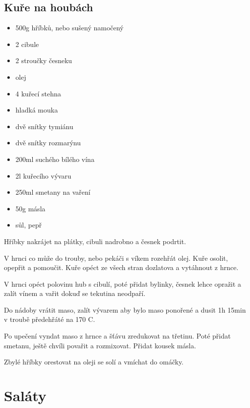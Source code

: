 \documentclass[10pt,a4paper]{article}
\newenvironment{myitemize}
{ \begin{itemize}
    \setlength{\itemsep}{0pt}
    \setlength{\parskip}{0pt}
    \setlength{\parsep}{0pt}     }
{ \end{itemize}                  }
\begin{document}
\subsection{Kuře na houbách}
\begin{minipage}[t]{0,5\textwidth}
\begin{myitemize} 
\item 500g hříbků, nebo sušený namočený
\item 2 cibule
\item 2 stroučky česneku
\item olej
\item 4 kuřecí stehna
\item hladká mouka
\item dvě snítky tymiánu
\item dvě snítky rozmarýnu
\item 200ml suchého bílého vína
\item 2l kuřecího vývaru
\item 250ml smetany na vaření
\item 50g másla
\item sůl, pepř
\end{myitemize}
\end{minipage}
\begin{minipage}[t]{0,5\textwidth}
Hříbky nakrájet na plátky, cibuli nadrobno a česnek podrtit.

V hrnci co může do trouby, nebo pekáči s víkem rozehřát olej. Kuře osolit, opepřit a pomoučit. Kuře opéct ze všech stran dozlatova a vytáhnout z hrnce.

V hrnci opéct polovinu hub s cibulí, poté přidat bylinky, česnek lehce opražit a zalít vínem a vařit dokuď se tekutina neodpaří.

Do nádoby vrátit maso, zalít vývarem aby bylo maso ponořené a dusit 1h 15min v troubě předehřáté na 170 \degree C.

Po upečení vyndat maso z hrnce a šťávu zredukovat na třetinu. Poté přidat smetanu, ještě chvíli povařit a rozmixovat. Přidat kousek másla.

Zbylé hříbky orestovat na oleji se solí a vmíchat do omáčky.
\end{minipage}
\pagebreak
\section{Saláty}
\end{document}
